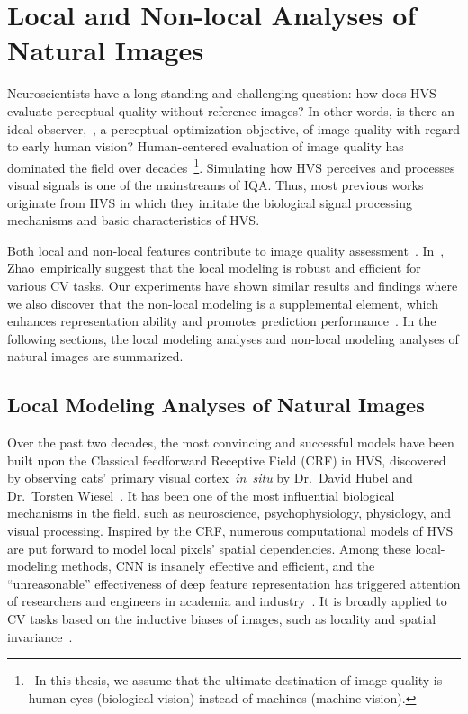 \chapter{Local and Non-local Analyses of Natural Images}\label{chap:chapter3}
\graphicspath{{Chapter3/}}

Neuroscientists have a long-standing and challenging question: how does HVS evaluate perceptual quality without reference images? In other words, is there an ideal observer,~\ie, a perceptual optimization objective, of image quality with regard to early human vision? Human-centered evaluation of image quality has dominated the field over decades~\footnote{~In this thesis, we assume that the ultimate destination of image quality is human eyes (biological vision) instead of machines (machine vision).}. Simulating how HVS perceives and processes visual signals is one of the mainstreams of IQA. Thus, most previous works originate from HVS in which they imitate the biological signal processing mechanisms and basic characteristics of HVS.

Both local and non-local features contribute to image quality assessment~\citep{golestaneh2021no}. In~\citep{zhao2021battle}, Zhao~\etal empirically suggest that the local modeling is robust and efficient for various CV tasks. Our experiments have shown similar results and findings where we also discover that the non-local modeling is a supplemental element, which enhances representation ability and promotes prediction performance~\citep{wang2018non, liu2020long}. In the following sections, the local modeling analyses and non-local modeling analyses of natural images are summarized.

\section{Local Modeling Analyses of Natural Images}\label{Local Modeling Analyses of Natural Images}
Over the past two decades, the most convincing and successful models have been built upon the Classical feedforward Receptive Field (CRF) in HVS, discovered by observing cats' primary visual cortex~\emph{in~situ} by Dr.~David Hubel and Dr.~Torsten Wiesel~\citep{hubel1968receptive}. It has been one of the most influential biological mechanisms in the field, such as neuroscience, psychophysiology, physiology, and visual processing. Inspired by the CRF, numerous computational models of HVS are put forward to model local pixels' spatial dependencies. Among these local-modeling methods, CNN is insanely effective and efficient, and the ``unreasonable'' effectiveness of deep feature representation has triggered attention of researchers and engineers in academia and industry~\citep{lecun1998gradient, zhang2018unreasonable, SimonyanZ14a, dingIQA}. It is broadly applied to CV tasks based on the inductive biases of images, such as locality and spatial invariance~\citep{SimonyanZ14a}. 

